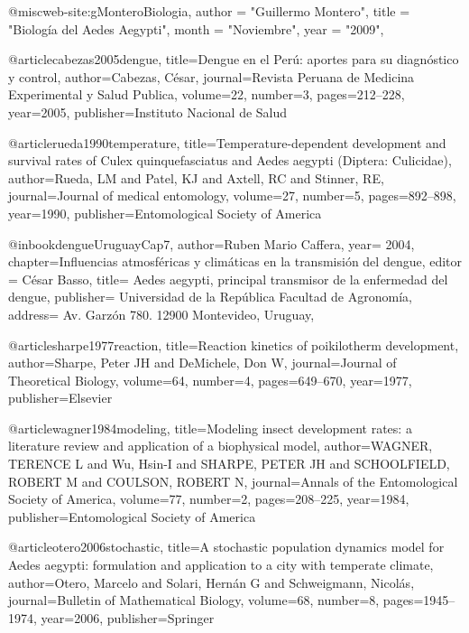 @misc{web-site:gMonteroBiologia,
      author = "Guillermo Montero",
      title = "Biología del Aedes Aegypti",
      month = "Noviembre",
      year = "2009",
}

@article{cabezas2005dengue,
  title={Dengue en el Per{\'u}: aportes para su diagn{\'o}stico y control},
  author={Cabezas, C{\'e}sar},
  journal={Revista Peruana de Medicina Experimental y Salud Publica},
  volume={22},
  number={3},
  pages={212--228},
  year={2005},
  publisher={Instituto Nacional de Salud}
}

@article{rueda1990temperature,
  title={Temperature-dependent development and survival rates of Culex quinquefasciatus and Aedes aegypti (Diptera: Culicidae)},
  author={Rueda, LM and Patel, KJ and Axtell, RC and Stinner, RE},
  journal={Journal of medical entomology},
  volume={27},
  number={5},
  pages={892--898},
  year={1990},
  publisher={Entomological Society of America}
}

@inbook{dengueUruguayCap7,
  author={Ruben Mario Caffera},
  year= 2004,
  chapter={Influencias atmosféricas y climáticas en la transmisión del dengue},
  editor = {César Basso},
  title= {Aedes aegypti, principal transmisor de la enfermedad del dengue},
  publisher= {Universidad de la República Facultad de Agronomía},
  address= {Av. Garzón 780. 12900 Montevideo, Uruguay},
}

@article{sharpe1977reaction,
  title={Reaction kinetics of poikilotherm development},
  author={Sharpe, Peter JH and DeMichele, Don W},
  journal={Journal of Theoretical Biology},
  volume={64},
  number={4},
  pages={649--670},
  year={1977},
  publisher={Elsevier}
}

@article{wagner1984modeling,
  title={Modeling insect development rates: a literature review and application of a biophysical model},
  author={WAGNER, TERENCE L and Wu, Hsin-I and SHARPE, PETER JH and SCHOOLFIELD, ROBERT M and COULSON, ROBERT N},
  journal={Annals of the Entomological Society of America},
  volume={77},
  number={2},
  pages={208--225},
  year={1984},
  publisher={Entomological Society of America}
}

@article{otero2006stochastic,
  title={A stochastic population dynamics model for Aedes aegypti: formulation and application to a city with temperate climate},
  author={{Otero}, {Marcelo and Solari, Hern{\'a}n G and Schweigmann, Nicol{\'a}s}},
  journal={Bulletin of Mathematical Biology},
  volume={68},
  number={8},
  pages={1945--1974},
  year={2006},
  publisher={Springer}
}


